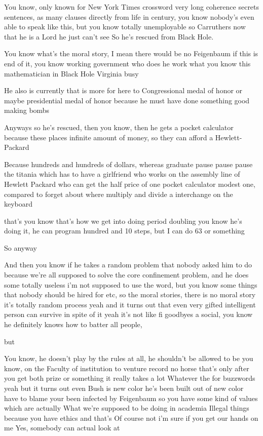 \begin{description}
You know, only known for New York Times crossword very long
coherence secrets sentences, as many clauses directly from life in
century, you know nobody's even able to speak like this, but you
know totally unemployable so Carruthers now that he is a Lord he
just can't see So he's rescued from Black Hole.

You know what's the moral story, I mean there would be no
Feigenbaum if this is end of it, you know working government who
does he work what you know this mathematician in Black Hole
Virginia busy

He also is currently that is more for here to Congressional medal
of honor or maybe presidential medal of honor because he must have
done something good making bombs

Anyways so he's rescued, then you know, then he gets a pocket
calculator because these places infinite amount of money, so they
can afford a Hewlett-Packard

Because hundreds and hundreds of dollars, whereas graduate pause
pause pause the titania which has to have a girlfriend who works on
the assembly line of Hewlett Packard who can get the half price of
one pocket calculator modest one, compared to forget about where
multiply and divide a interchange on the keyboard

that's you know that's how we get into doing period doubling you
know he's doing it, he can program hundred and 10 steps, but I can
do 63 or something

So anyway

And then you know if he takes a random problem that nobody asked
him to do because we're all supposed to solve the core confinement
problem, and he does some totally useless i'm not supposed to use
the word, but you know some things that nobody should be hired for
etc, so the moral stories, there is no moral story it's totally
random process yeah and it turns out that even very gifted
intelligent person can survive in spite of it yeah it's not like fi
goodbyes a social, you know he definitely knows how to batter all
people,

but

You know, he doesn't play by the rules at all, he shouldn't be
allowed to be you know, on the Faculty of institution to venture
record no horse that's only after you get both prize or something
it really takes a lot Whatever the for buzzwords yeah but it turns
out even Bush is new color he's been built out of new color have to
blame your been infected by Feigenbaum so you have some kind of
values which are actually What we're supposed to be doing in
academia Illegal things because you have ethics and that's Of
course not i'm sure if you get our hands on me Yes, somebody can
actual look at


\end{description}
